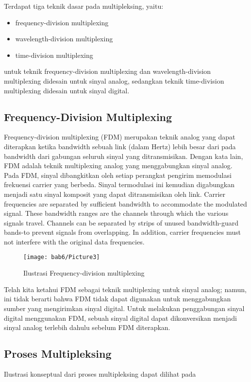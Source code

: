 Terdapat tiga teknik dasar pada multipleksing, yaitu:
\begin{itemize}
  \item frequency-division multiplexing
  \item wavelength-division multiplexing
  \item time-division multiplexing
\end{itemize}
untuk teknik frequency-division multiplexing dan wavelength-division multiplexing didesain untuk sinyal analog, sedangkan teknik time-division multiplexing didesain untuk sinyal digital.

\subsection{Frequency-Division Multiplexing}
Frequency-division multiplexing (FDM) merupakan teknik analog yang dapat diterapkan ketika bandwidth sebuah link (dalam Hertz) lebih besar dari pada bandwidth dari gabungan seluruh sinyal yang ditransmisikan. Dengan kata lain, FDM adalah teknik multiplexing analog yang menggabungkan sinyal analog. Pada FDM, sinyal dibangkitkan oleh setiap perangkat pengirim memodulasi frekuensi carrier yang berbeda. Sinyal termodulasi ini kemudian digabungkan menjadi satu sinyal komposit yang dapat ditransmisikan oleh link. Carrier frequencies are separated by sufficient bandwidth to accommodate the modulated signal. These bandwidth ranges are the channels through which the various signals travel. Channels can be separated by strips of unused bandwidth-guard bands-to prevent signals from overlapping. In addition, carrier frequencies must not interfere with the original data frequencies.

\begin{figure}[htbp]
  \centering
  \texttt{[image: bab6/Picture3]}
  \caption{Ilustrasi Frequency-division multiplexing}
  \label{fig6:2}
\end{figure}

Telah kita ketahui FDM sebagai teknik multiplexing untuk sinyal analog; namun, ini tidak berarti bahwa FDM tidak dapat digunakan untuk menggabungkan sumber yang mengirimkan sinyal digital. Untuk melakukan penggabungan sinyal digital menggunakan FDM, sebuah sinyal digital dapat dikonversikan menjadi sinyal analog terlebih dahulu sebelum FDM diterapkan.

\subsection*{Proses Multipleksing}
Ilustrasi konseptual dari proses multipleksing dapat dilihat pada


